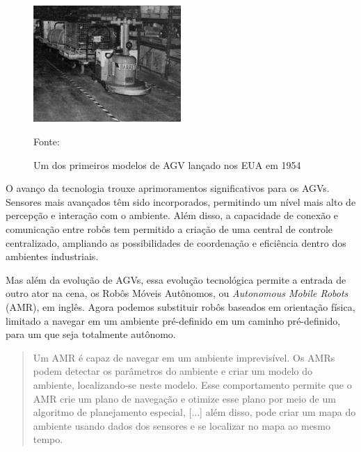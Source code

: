 \begin{figure}
    \centering
    \captionsetup{justification=centering}
    \caption{\small Um dos primeiros modelos de AGV lançado nos EUA em 1954}
    \includegraphics[width=0.5\textwidth]{imagens/AGV-1950.png}
    
    {\small Fonte: \cite{Ullrich2023}}
\end{figure}

O avanço da tecnologia trouxe aprimoramentos significativos para os AGVs. Sensores mais avançados têm sido incorporados, permitindo um nível mais alto de percepção e interação com o ambiente. Além disso, a capacidade de conexão e comunicação entre robôs tem permitido a criação de uma central de controle centralizado, ampliando as possibilidades de coordenação e eficiência dentro dos ambientes industriais. 

Mas além da evolução de AGVs, essa evolução tecnológica permite a entrada de outro ator na cena, os Robôs Móveis Autônomos, ou \emph{Autonomous Mobile Robots} (AMR), em inglês. Agora podemos substituir robôs baseados em orientação física, limitado a navegar em um ambiente pré-definido em um caminho pré-definido, para um que seja totalmente autônomo. 

\begin{quote} %
    \setlength{\leftskip}{4cm} %
    \setlength{\rightskip}{0cm} %
    \footnotesize %
    \setlength{\parskip}{1em} %
    \setlength{\parindent}{0cm} %

    Um AMR é capaz de navegar em um ambiente imprevisível. Os AMRs podem detectar os parâmetros do ambiente e criar um modelo do ambiente, localizando-se neste modelo. Esse comportamento permite que o AMR crie um plano de navegação e otimize esse plano por meio de um algoritmo de planejamento especial, [...] além disso, pode criar um mapa do ambiente usando dados dos sensores e se localizar no mapa ao mesmo tempo. \cite[p.1, tradução nossa]{Murat2017}    

\end{quote}

